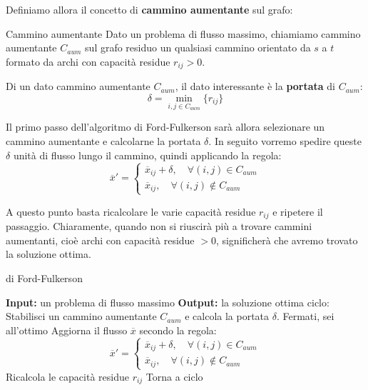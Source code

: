 \documentclass[a4paper,11pt]{article}
\begin{document}
Definiamo allora il concetto di \textbf{cammino aumentante} sul grafo:
\begin{definition}{Cammino aumentante}
Dato un problema di flusso massimo, chiamiamo cammino aumentante $C_{aum}$ sul grafo residuo un qualsiasi cammino orientato da $s$ a $t$ formato da archi con capacità residue $r_{ij} > 0$.
\end{definition}

Di un dato cammino aumentante $C_{aum}$, il dato interessante è la \textbf{portata} di $C_{aum}$:
$$
\delta = \min_{i,j \in C_{aum}} \{ r_{ij} \}
$$

Il primo passo dell'algoritmo di Ford-Fulkerson sarà allora selezionare un cammino aumentante e calcolarne la portata $\delta$.
In seguito vorremo spedire queste $\delta$ unità di flusso lungo il cammino, quindi applicando la regola:
\[
	\overline{x}' = 	
	\begin{cases}
		\overline{x}_{ij} + \delta, \quad \forall (i, j) \in C_{aum} \\ 
		\overline{x}_{ij}, \quad \forall (i, j) \notin C_{aum}
	\end{cases}
\]

A questo punto basta ricalcolare le varie capacità residue $r_{ij}$ e ripetere il passaggio.
Chiaramente, quando non si riuscirà più a trovare cammini aumentanti, cioè archi con capacità residue $> 0$, significherà che avremo trovato la soluzione ottima. 

\begin{algorithm}[H]
\caption{di Ford-Fulkerson}
\begin{algorithmic}
	\STATE \textbf{Input:} un problema di flusso massimo
	\STATE \textbf{Output:} la soluzione ottima
	\STATE \textsf{ciclo:}
	\STATE Stabilisci un cammino aumentante $C_{aum}$ e calcola la portata $\delta$.
		\STATE Fermati, sei all'ottimo
	\ENDIF
	\STATE Aggiorna il flusso $\overline{x}$ secondo la regola:
	\[
		\overline{x}' = 	
		\begin{cases}
			\overline{x}_{ij} + \delta, \quad \forall (i, j) \in C_{aum} \\ 
			\overline{x}_{ij}, \quad \forall (i, j) \notin C_{aum}
		\end{cases}
	\]
	\STATE Ricalcola le capacità residue $r_{ij}$
	\STATE Torna a \textsf{ciclo}
\end{algorithmic}
\end{algorithm}

\lstset{style=codestyle}
\end{document}
